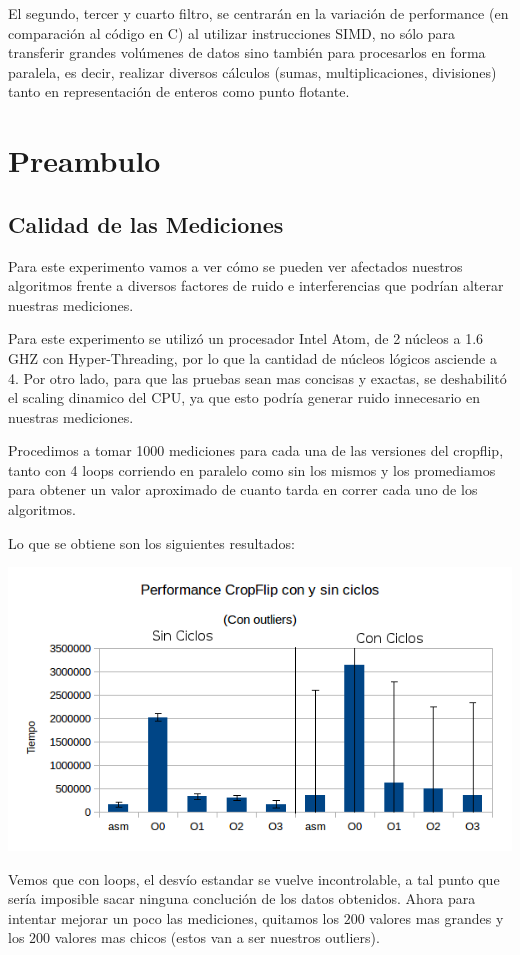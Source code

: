 \documentclass[a4paper]{article}
\begin{document}
El segundo, tercer y cuarto filtro, se centrarán en la variación de performance (en comparación al código en C) al utilizar instrucciones SIMD, no sólo para transferir grandes volúmenes de datos sino también para procesarlos en forma paralela, es decir, realizar diversos cálculos (sumas, multiplicaciones, divisiones) tanto en representación de enteros como punto flotante.

\newpage
\section{Preambulo}

\subsection{Calidad de las Mediciones}
Para este experimento vamos a ver cómo se pueden ver afectados nuestros algoritmos frente a diversos factores de ruido e interferencias que podrían alterar nuestras mediciones.

Para este experimento se utilizó un procesador Intel Atom, de 2 núcleos a 1.6 GHZ con Hyper-Threading, por lo que la cantidad de núcleos lógicos asciende a 4. Por otro lado, para que las pruebas sean mas concisas y exactas, se deshabilitó el scaling dinamico del CPU, ya que esto podría generar ruido innecesario en nuestras mediciones.

Procedimos a tomar 1000 mediciones para cada una de las versiones del cropflip, tanto con 4 loops corriendo en paralelo como sin los mismos y los promediamos para obtener un valor aproximado de cuanto tarda en correr cada uno de los algoritmos.

Lo que se obtiene son los siguientes resultados:
\begin{center}
  \includegraphics[scale=0.66]{Graficos1.4/1.3/perConOut.png}
\end{center}
Vemos que con loops, el desvío estandar se vuelve incontrolable, a tal punto que sería imposible sacar ninguna conclución de los datos obtenidos. Ahora para intentar mejorar un poco las mediciones, quitamos los $200$ valores mas grandes y los $200$ valores mas chicos (estos van a ser nuestros outliers).
\end{document}
